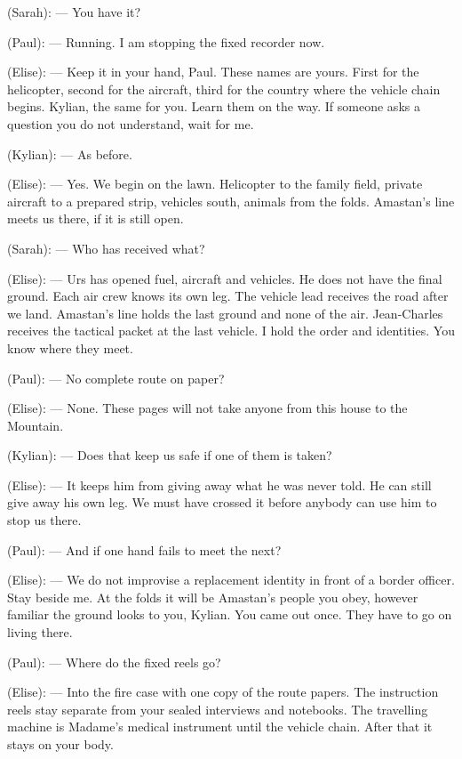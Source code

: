 \begin{room}
(Sarah): --- You have it?

(Paul): --- Running. I am stopping the fixed recorder now.

\centerline{}

(Elise): --- Keep it in your hand, Paul. These names are yours. First for the helicopter, second for the aircraft, third for the country where the vehicle chain begins. Kylian, the same for you. Learn them on the way. If someone asks a question you do not understand, wait for me.

(Kylian): --- As before.

(Elise): --- Yes. We begin on the lawn. Helicopter to the family field, private aircraft to a prepared strip, vehicles south, animals from the folds. Amastan's line meets us there, if it is still open.

(Sarah): --- Who has received what?

(Elise): --- Urs has opened fuel, aircraft and vehicles. He does not have the final ground. Each air crew knows its own leg. The vehicle lead receives the road after we land. Amastan's line holds the last ground and none of the air. Jean-Charles receives the tactical packet at the last vehicle. I hold the order and identities. You know where they meet.

(Paul): --- No complete route on paper?

(Elise): --- None. These pages will not take anyone from this house to the Mountain.

(Kylian): --- Does that keep us safe if one of them is taken?

(Elise): --- It keeps him from giving away what he was never told. He can still give away his own leg. We must have crossed it before anybody can use him to stop us there.

(Paul): --- And if one hand fails to meet the next?

(Elise): --- We do not improvise a replacement identity in front of a border officer. Stay beside me. At the folds it will be Amastan's people you obey, however familiar the ground looks to you, Kylian. You came out once. They have to go on living there.

(Paul): --- Where do the fixed reels go?

(Elise): --- Into the fire case with one copy of the route papers. The instruction reels stay separate from your sealed interviews and notebooks. The travelling machine is Madame's medical instrument until the vehicle chain. After that it stays on your body.


\end{room}
